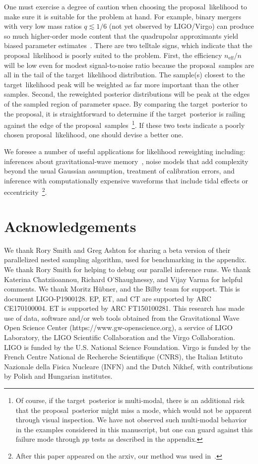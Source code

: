 \documentclass[prd,superscriptaddress,twocolumn,nopreprintnumbers,floatfix,longbibliography]{revtex4}
\newcommand{\proposal}{proposal}
\newcommand{\target}{target}
\begin{document}
One must exercise a degree of caution when choosing the \proposal\ likelihood to make sure it is suitable for the problem at hand.
For example, binary mergers with very low mass ratios $q\lesssim 1/6$ (not yet observed by LIGO/Virgo) can produce so much higher-order mode content that the quadrupolar approximants yield biased parameter estimates~\cite{bustillo,varma}.
There are two telltale signs, which indicate that the \proposal\ likelihood is poorly suited to the problem.
First, the efficiency $n_\text{eff}/n$ will be low even for modest signal-to-noise ratio because the \proposal\ samples are all in the tail of the \target\ likelihood distribution.
The sample(s) closest to the \target\ likelihood peak will be weighted as far more important than the other samples.
Second, the reweighted posterior distributions will be peak at the edges of the sampled region of parameter space.
By comparing the \target\ posterior to the \proposal, it is straightforward to determine if the \target\ posterior is railing against the edge of the \proposal\ samples~\footnote{Of course, if the \target\ posterior is multi-modal, there is an additional risk that the \proposal\ posterior might miss a mode, which would not be apparent through visual inspection. We have not observed such multi-modal behavior in the examples considered in this manuscript, but one can guard against this failure mode through $pp$ tests as described in the appendix.}.
If these two tests indicate a poorly chosen \proposal\ likelihood, one should devise a better one.

We foresee a number of useful applications for likelihood reweighting including: inferences about gravitational-wave memory~\cite{memory}, noise models that add complexity beyond the usual Gaussian assumption, treatment of calibration errors, and inference with computationally expensive waveforms that include tidal effects or eccentricity~\footnote{After this paper appeared on the arxiv, our method was used in~\cite{isobel}.}.


\section{Acknowledgements}
We thank Rory Smith and Greg Ashton for sharing a beta version of their parallelized nested sampling algorithm, used for benchmarking in the appendix.
We thank Rory Smith for helping to debug our parallel inference runs.
We thank Katerina Chatziioannou, Richard O'Shaughnessy, and Vijay Varma for helpful comments.
We thank Moritz H{\"u}bner, and the {\sc Bilby} team for support.
This is document LIGO-P1900128.
EP, ET, and CT are supported by ARC CE170100004.
ET is supported by ARC FT150100281.
This research has made use of data, software and/or web tools obtained from the Gravitational Wave Open Science Center (https://www.gw-openscience.org), a service of LIGO Laboratory, the LIGO Scientific Collaboration and the Virgo Collaboration. LIGO is funded by the U.S. National Science Foundation. Virgo is funded by the French Centre National de Recherche Scientifique (CNRS), the Italian Istituto Nazionale della Fisica Nucleare (INFN) and the Dutch Nikhef, with contributions by Polish and Hungarian institutes.
\end{document}
